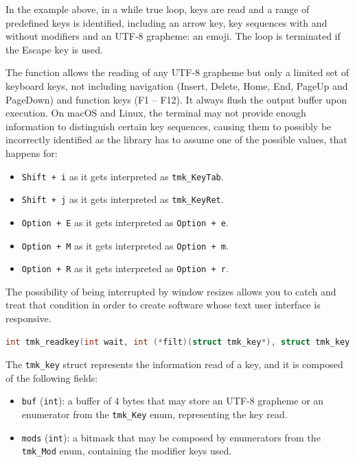 \documentclass{report}
\begin{document}
In the example above, in a while true loop, keys are read and a range of predefined keys is identified, including an arrow key, key sequences with and without modifiers and an UTF-8 grapheme: an emoji. The loop is terminated if the Escape key is used.

The function allows the reading of any UTF-8 grapheme but only a limited set of keyboard keys, not including navigation (Insert, Delete, Home, End, PageUp and PageDown) and function keys (F1 – F12). It always flush the output buffer upon execution. On macOS and Linux, the terminal may not provide enough information to distinguish certain key sequences, causing them to possibly be incorrectly identified as the library has to assume one of the possible values, that happens for:
\begin{itemize}
  \item \texttt{Shift + i} as it gets interpreted as \texttt{tmk\_KeyTab}.
  \item \texttt{Shift + j} as it gets interpreted as \texttt{tmk\_KeyRet}.
  \item \texttt{Option + E} as it gets interpreted as \texttt{Option + e}.
  \item \texttt{Option + M} as it gets interpreted as \texttt{Option + m}.
  \item \texttt{Option + R} as it gets interpreted as \texttt{Option + r}.
\end{itemize}

The possibility of being interrupted by window resizes allows you to catch and treat that condition in order to create software whose text user interface is responsive.
\begin{lstlisting}[language=c,caption=the declaration of the \texttt{tmk\_readkey} function.]
int tmk_readkey(int wait, int (*filt)(struct tmk_key*), struct tmk_key *key);
\end{lstlisting}

The \texttt{tmk\_key} struct represents the information read of a key, and it is composed of the following fields:
\begin{itemize}
  \item \texttt{buf} (\texttt{int}): a buffer of 4 bytes that may store an UTF-8 grapheme or an enumerator from the \texttt{tmk\_Key} enum, representing the key read.
  \item \texttt{mods} (\texttt{int}): a bitmask that may be composed by enumerators from the \texttt{tmk\_Mod} enum, containing the modifier keys used.
\end{itemize}
\end{document}
